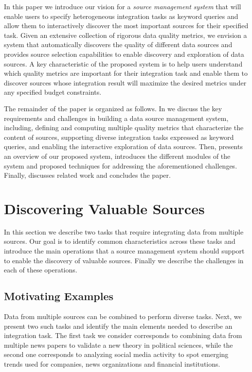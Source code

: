 \documentclass{sig-alternate}
\begin{document}
In this paper we introduce our vision for a {\em source management system} that will enable users to specify heterogeneous integration tasks as keyword queries and allow them to interactively discover the most important sources for their specified task. Given an extensive collection of rigorous data quality metrics, we envision a system that automatically discovers the quality of different data sources and provides source selection capabilities to enable discovery and exploration of data sources. A key characteristic of the proposed system is to help users understand which quality metrics are important for their integration task and enable them to discover sources whose integration result will maximize the desired metrics under any specified budget constraints. 

The remainder of the paper is organized as follows. In  we discuss the key requirements and challenges in building a data source management system, including, defining and computing multiple quality metrics that characterize the content of sources, supporting diverse integration tasks expressed as keyword queries,  and enabling the interactive exploration of data sources. Then,  presents an overview of our proposed system, introduces the different modules of the system and proposed  techniques for addressing the aforementioned challenges. Finally,  discusses related work and  concludes the paper. 

\section{Discovering Valuable Sources}
\label{sec:discovery}
In this section we describe two tasks that require integrating data from multiple sources. Our goal is to identify common characteristics across these tasks and introduce the main operations that a source management system should support to enable the discovery of valuable sources. Finally we describe the challenges in each of these operations.

\subsection{Motivating Examples}
\label{sec:example}
Data from multiple sources can be combined to perform diverse tasks. Next, we present two such tasks and identify the main elements needed to describe an integration task. The first task we consider corresponds to combining data from multiple news papers to validate a new theory in political sciences, while the second one corresponds to analyzing social media activity to spot emerging trends used for companies, news organizations and financial institutions. 
\end{document}
